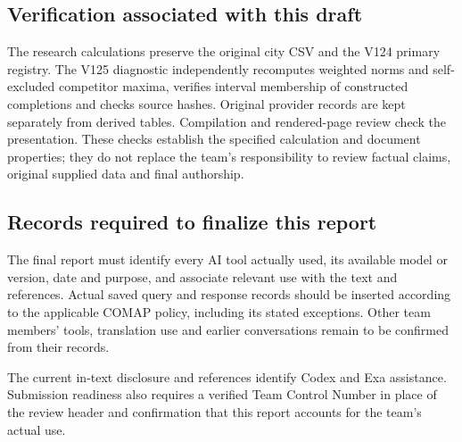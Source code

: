\subsection*{Verification associated with this draft}
The research calculations preserve the original city CSV and the V124 primary
registry. The V125 diagnostic independently recomputes weighted norms and
self-excluded competitor maxima, verifies interval membership of constructed
completions and checks source hashes. Original provider records are kept
separately from derived tables. Compilation and rendered-page review check the
presentation. These checks establish the specified calculation and document
properties; they do not replace the team's responsibility to review factual
claims, original supplied data and final authorship.

\subsection*{Records required to finalize this report}
The final report must identify every AI tool actually used, its available
model or version, date and purpose, and associate relevant use with the text
and references. Actual saved query and response records should be inserted
according to the applicable COMAP policy, including its stated exceptions.
Other team members' tools, translation use and earlier conversations remain
to be confirmed from their records.

The current in-text disclosure and references identify Codex and Exa
assistance. Submission readiness also requires a verified Team Control Number
in place of the review header and confirmation that this report accounts for
the team's actual use.

